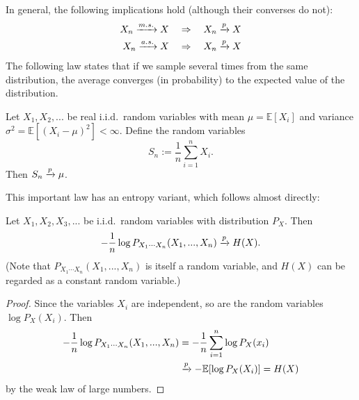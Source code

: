 In general, the following implications hold (although their converses do not):
\begin{align}
X_n \xrightarrow{m.s.} X \ \ \ &\Rightarrow\ \ \  X_n \xrightarrow{p} X\\
X_n \xrightarrow{a.s.} X \ \ \ &\Rightarrow\ \ \  X_n \xrightarrow{p} X
\end{align}
The following law states that if we sample several times from the same distribution, the average converges (in probability) to the expected value of the distribution.
\begin{theorem}
Let $X_1, X_2, ...$ be real i.i.d.\ random variables with mean $\mu = \mathbb{E}[X_i]$ and variance $\sigma^2 = \mathbb{E}[(X_i - \mu)^2] < \infty$. Define the random variables
\[
S_n := \frac{1}{n} \sum_{i=1}^n X_i.
\]
Then $S_n \xrightarrow{p} \mu$.
\end{theorem}
This important law has an entropy variant, which follows almost directly:
\begin{theorem}\label{thm:aep}
Let $X_1, X_2, X_3, ...$ be i.i.d.\ random variables with distribution $P_X$. Then
\[
-\frac{1}{n} \log P_{X_1 \cdots X_n}(X_1, ..., X_n) \xrightarrow{p} H(X).
\]
(Note that $P_{X_1 \cdots X_n}(X_1, ..., X_n)$ is itself a random variable, and $H(X)$ can be regarded as a constant random variable.)
\end{theorem}
\begin{proof}
Since the variables $X_i$ are independent, so are the random variables $\log P_X(X_i)$. Then
\begin{align}
-\frac{1}{n} \log P_{X_1\cdots X_n}(X_1, ..., X_n) &= -\frac{1}{n} \sum_{i=1}^n \log P_X(x_i)\nonumber\\
&\xrightarrow{p} - \mathbb{E}[\log P_X(X_i)] = H(X)
\end{align}
by the weak law of large numbers.
\end{proof}

